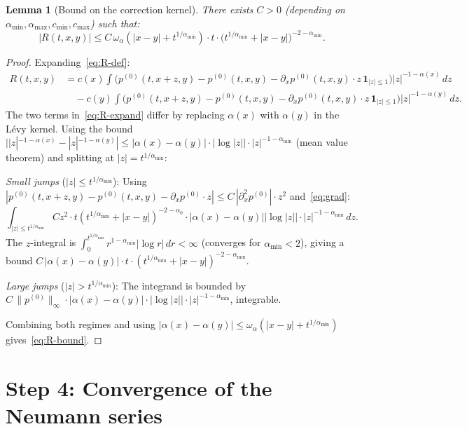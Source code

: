 \documentclass{amsart}
\newtheorem{lemma}[theorem]{Lemma}
\theoremstyle{definition}
\begin{document}
\begin{lemma}[Bound on the correction kernel]
\label{lem:R-bound}
There exists $C>0$ (depending on $\alpha_{\min},\alpha_{\max},c_{\min},c_{\max}$)
such that:
\begin{equation}
    |R(t,x,y)|
    \leq C\,\omega_\alpha\!\left(|x-y| + t^{1/\alpha_{\min}}\right)
         \cdot t \cdot \bigl(t^{1/\alpha_{\min}}+|x-y|\bigr)^{-2-\alpha_{\min}}.
    \label{eq:R-bound}
\end{equation}
\end{lemma}

\begin{proof}
Expanding~\eqref{eq:R-def}:
\begin{align}
    R(t,x,y)
    &= c(x)\int \bigl(p^{(0)}(t,x+z,y)-p^{(0)}(t,x,y)
       -\partial_x p^{(0)}(t,x,y)\cdot z\,\mathbf{1}_{|z|\leq 1}\bigr)
       |z|^{-1-\alpha(x)}\,dz \nonumber\\
    &\quad - c(y)\int \bigl(p^{(0)}(t,x+z,y)-p^{(0)}(t,x,y)
       -\partial_x p^{(0)}(t,x,y)\cdot z\,\mathbf{1}_{|z|\leq 1}\bigr)
       |z|^{-1-\alpha(y)}\,dz.
    \label{eq:R-expand}
\end{align}
The two terms in~\eqref{eq:R-expand} differ by replacing $\alpha(x)$ with $\alpha(y)$
in the L\'evy kernel. Using the bound
$||z|^{-1-\alpha(x)}-|z|^{-1-\alpha(y)}| \leq |\alpha(x)-\alpha(y)|\cdot|\log|z||\cdot
|z|^{-1-\alpha_{\min}}$
(mean value theorem) and splitting at $|z|=t^{1/\alpha_{\min}}$:

\emph{Small jumps} ($|z|\leq t^{1/\alpha_{\min}}$):
Using $|p^{(0)}(t,x+z,y)-p^{(0)}(t,x,y)-\partial_x p^{(0)}\cdot z|
\leq C\,|\partial^2_x p^{(0)}|\cdot z^2$ and~\eqref{eq:grad}:
\[
    \int_{|z|\leq t^{1/\alpha_{\min}}}
    C z^2 \cdot t(t^{1/\alpha_{\min}}+|x-y|)^{-2-\alpha_0}
    \cdot |\alpha(x)-\alpha(y)||\log|z||\cdot |z|^{-1-\alpha_{\min}}\,dz.
\]
The $z$-integral is $\int_0^{t^{1/\alpha_{\min}}} r^{1-\alpha_{\min}}|\log r|\,dr < \infty$
(converges for $\alpha_{\min}<2$), giving a bound
$C\,|\alpha(x)-\alpha(y)|\cdot t\cdot(t^{1/\alpha_{\min}}+|x-y|)^{-2-\alpha_{\min}}$.

\emph{Large jumps} ($|z|>t^{1/\alpha_{\min}}$):
The integrand is bounded by $C\,\|p^{(0)}\|_\infty\cdot|\alpha(x)-\alpha(y)|\cdot
|\log|z||\cdot|z|^{-1-\alpha_{\min}}$, integrable.

Combining both regimes and using $|\alpha(x)-\alpha(y)|\leq\omega_\alpha(|x-y|+t^{1/\alpha_{\min}})$
gives~\eqref{eq:R-bound}.
\end{proof}

\section{Step 4: Convergence of the Neumann series}
\end{document}
